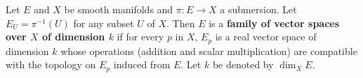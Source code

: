 Let $E$ and $X$ be smooth manifolds and $\pi: E \rightarrow X$ a submersion. Let $E_U = \pi^{-1}(U)$ for any subset $U$ of $X$. Then $E$ is a \textbf{family of vector spaces over $X$ of dimension $k$} if for every $p$ in $X$, $E_p$ is a real vector space of dimension $k$ whose operations (addition and scalar multiplication) are compatible with the topology on $E_p$ induced from $E$. Let $k$ be denoted by $\dim_X E$.
